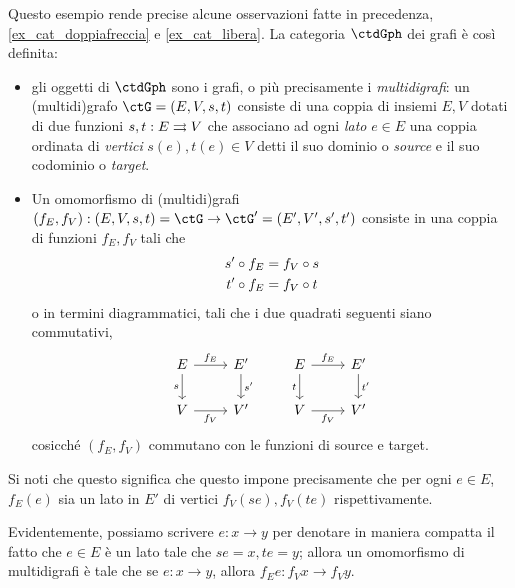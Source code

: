 \begin{example}\label{ex_cat_grafi}
	Questo esempio rende precise alcune osservazioni fatte in precedenza, \ref{ex_cat_doppiafreccia} e \ref{ex_cat_libera}. La categoria \(\ctdGph\) dei grafi è così definita:
	\begin{itemize}
		\item gli oggetti di \(\ctdGph\) sono i grafi, o più precisamente i \emph{multidigrafi}: un (multidi)grafo \(\ctG = (E,V,s,t)\) consiste di una coppia di insiemi \(E,V\) dotati di due funzioni \(s,t : E\rightrightarrows V\) che associano ad ogni \emph{lato} \(e\in E\) una coppia ordinata di \emph{vertici} \(s(e),t(e)\in V\) detti il suo dominio o \emph{source} e il suo codominio o \emph{target}.
		\item Un omomorfismo di (multidi)grafi \((f_E,f_V) : (E,V,s,t)=\ctG\to\ctG'= (E', V',s',t')\) consiste in una coppia di funzioni \(f_E, f_V\) tali che
		      \begin{gather*}
			      s'\circ f_E = f_V\circ s\\
			      t'\circ f_E = f_V\circ t
		      \end{gather*}
		      o in termini diagrammatici, tali che i due quadrati seguenti siano commutativi,
		      \[\begin{tikzcd}
				      E & {E'} & E & {E'} \\
				      V & {V'} & V & {V'}
				      \arrow["{f_E}", from=1-1, to=1-2]
				      \arrow["{s'}", from=1-2, to=2-2]
				      \arrow["{f_V}"', from=2-1, to=2-2]
				      \arrow["s"', from=1-1, to=2-1]
				      \arrow["{f_E}", from=1-3, to=1-4]
				      \arrow["{f_V}"', from=2-3, to=2-4]
				      \arrow["{t'}", from=1-4, to=2-4]
				      \arrow["t"', from=1-3, to=2-3]
			      \end{tikzcd}\]
		      cosicché \((f_E,f_V)\) commutano con le funzioni di source e target.
	\end{itemize}
	Si noti che questo significa che questo impone precisamente che per ogni \(e\in E\), \(f_E(e)\) sia un lato in \(E'\) di vertici \(f_V(se), f_V(te)\) rispettivamente.
\end{example}
Evidentemente, possiamo scrivere \(e : x\to y\) per denotare in maniera compatta il fatto che \(e \in E\) è un lato tale che \(se=x,te=y\); allora un omomorfismo di multidigrafi è tale che se \(e : x\to y\), allora \(f_Ee : f_Vx\to f_Vy\).
